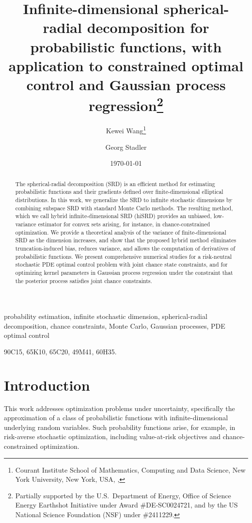 \documentclass[%
onefignum,onetabnum]{siamonline250211}
\title{Infinite-dimensional spherical-radial decomposition for
probabilistic functions,
with application to constrained optimal control and Gaussian process regression\thanks{Partially supported by the U.S.\ Department of Energy, Office of Science Energy Earthshot Initiative under Award \#DE-SC0024721, and by the US National Science Foundation (NSF) under \#2411229.
}}
\author{Kewei Wang\thanks{Courant Institute School of Mathematics, Computing and Data Science, New York University, New York, USA, \email{kw3645@nyu.edu}, \email{stadler@cims.nyu.edu}} \and  Georg Stadler\footnotemark[2]}
\date{\today}
\newcommand{\hiSRD}{{\sc hiSRD}}
\begin{document}
\maketitle

\begin{abstract}
The spherical-radial decomposition (SRD) is an efficient method for estimating probabilistic functions and their gradients defined over finite-dimensional elliptical distributions. In this work, we generalize the SRD to infinite stochastic dimensions by combining subspace SRD with standard Monte Carlo methods. The resulting method, which we call hybrid infinite-dimensional SRD (\hiSRD) provides an unbiased, low-variance estimator for convex sets arising, for instance, in chance-constrained optimization. We provide a theoretical analysis of the variance of finite-dimensional SRD as the dimension increases, and show that the proposed hybrid method eliminates truncation-induced bias, reduces variance, and allows the computation of derivatives of probabilistic functions. We present comprehensive numerical studies for a risk-neutral stochastic PDE optimal control problem with joint chance state constraints, and for optimizing kernel parameters in Gaussian process regression under the constraint that the posterior process satisfies joint chance constraints.
\end{abstract}

\begin{keywords}
probability estimation, infinite stochastic dimension, spherical-radial decomposition, chance constraints, Monte Carlo, Gaussian processes, PDE optimal control
\end{keywords}

\begin{AMS}
90C15, %
65K10, %
65C20, %
49M41, %
60H35. %
\end{AMS}


\section{Introduction}
This work addresses optimization problems under uncertainty, specifically the approximation of a class of probabilistic functions with infinite-dimension\-al underlying random variables. Such probability functions arise, for example, in risk-averse stochastic optimization, including value-at-risk objectives and chance-constrained optimization.
\end{document}
